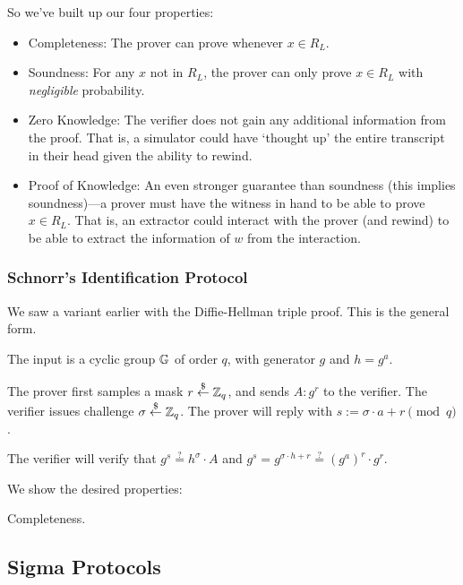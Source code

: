 So we've built up our four properties:
\begin{itemize}
    \item Completeness: The prover can prove whenever $x\in R_L$.
    \item Soundness: For any $x$ not in $R_L$, the prover can only prove $x\in R_L$ with \emph{negligible} probability.
    \item Zero Knowledge: The verifier does not gain any additional information from the proof. That is, a simulator could have `thought up' the entire transcript in their head given the ability to rewind.
    \item Proof of Knowledge: An even stronger guarantee than soundness (this implies soundness)---a prover must have the witness in hand to be able to prove $x\in R_L$. That is, an extractor could interact with the prover (and rewind) to be able to extract the information of $w$ from the interaction.
\end{itemize}

\subsubsection{Schnorr's Identification Protocol}
\begin{example}
    We saw a variant earlier with the Diffie-Hellman triple proof. This is the general form.


    The input is a cyclic group $\mathbb G$ of order $q$, with generator $g$ and $h = g^a$.

    The prover first samples a mask $r\overset{\$}{\leftarrow} \mathbb Z_q$, and sends $A:g^r$ to the verifier. The verifier issues challenge $\sigma\overset{\$}{\leftarrow} \mathbb Z_q$. The prover will reply with $s:=\sigma\cdot a + r\pmod{q}$.

    The verifier will verify that $g^s \overset{?}{=} h^\sigma\cdot A$ and $g^{s} = g^{\sigma\cdot h + r}\overset{?}{=} (g^a)^r\cdot g^r$.

    We show the desired properties:

    \begin{description}
        \item[Completeness.] 
    \end{description}
\end{example}

\subsection{Sigma Protocols}
